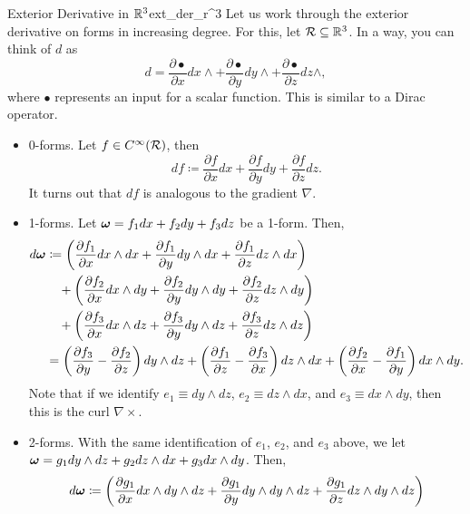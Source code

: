\begin{ex}{Exterior Derivative in $\mathbb{R}^3$}{ext_der_r^3}
Let us work through the exterior derivative on forms in increasing degree. For this, let $\mathcal{R} \subseteq \mathbb{R}^3$. In a way, you can think of $d$ as
\[
d = \frac{\partial \bullet}{\partial x} dx\wedge + \frac{\partial \bullet}{\partial y} dy\wedge + \frac{\partial \bullet}{\partial z} dz\wedge,
\]
where $\bullet$ represents an input for a scalar function. This is similar to a Dirac operator.
\begin{itemize}
    \item 0-forms. Let $f\in C^\infty(\mathcal{R})$, then
    \[
    df \coloneqq \frac{\partial f}{\partial x}dx + \frac{\partial f}{\partial y} dy + \frac{\partial f}{\partial z} dz.
    \]
    It turns out that $df$ is analogous to the gradient $\nabla$.
    \item 1-forms. Let $\boldsymbol{\omega} = f_1dx+f_2dy+f_3dz$ be a 1-form. Then,
    \begin{align*}
        d\boldsymbol{\omega} &\coloneqq \left( \frac{\partial f_1}{\partial x}dx\wedge dx + \frac{\partial f_1}{\partial y}dy\wedge dx+\frac{\partial f_1}{\partial z}dz\wedge dx \right)\\
        &\quad +\left( \frac{\partial f_2}{\partial x}dx\wedge dy + \frac{\partial f_2}{\partial y}dy\wedge dy+\frac{\partial f_2}{\partial z}dz\wedge dy \right)\\
        &\quad + \left( \frac{\partial f_3}{\partial x}dx\wedge dz + \frac{\partial f_3}{\partial y}dy\wedge dz+\frac{\partial f_3}{\partial z}dz\wedge dz \right)\\
        &=\left( \frac{\partial f_3}{\partial y}-\frac{\partial f_2}{\partial z}\right)dy\wedge dz + \left(\frac{\partial f_1}{\partial z}-\frac{\partial f_3}{\partial x}\right) dz\wedge dx + \left( \frac{\partial f_2}{\partial x} -\frac{\partial f_1}{\partial y}\right) dx\wedge dy.
    \end{align*}
    Note that if we identify $e_1 \equiv dy\wedge dz$, $e_2\equiv dz\wedge dx$, and $e_3\equiv dx\wedge dy$, then this is the curl $\nabla \times$.
    \item 2-forms. With the same identification of $e_1$, $e_2$, and $e_3$ above, we let $\boldsymbol{\omega} = g_1 dy\wedge dz + g_2 dz\wedge dx + g_3 dx\wedge dy$. Then,
    \begin{align*}
        d\covectfield &\coloneqq \left( \frac{\partial g_1}{\partial x} dx\wedge dy \wedge dz + \frac{\partial g_1}{\partial y} dy \wedge dy \wedge dz + \frac{\partial g_1}{\partial z}dz\wedge dy \wedge dz\right)\\

\end{align*}
\end{itemize}
\end{ex}
